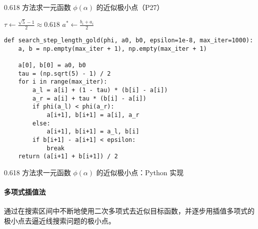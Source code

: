 \documentclass[cn]{elegantbook}
\begin{document}
\begin{algorithm}
    \caption{0.618 方法求一元函数 $\phi\left(\alpha\right)$ 的近似极小点（P27）}
    $\tau\leftarrow \frac{\sqrt{5}-1}{2}\approx 0.618$\;
    $a^{*}\leftarrow\frac{b_{i}+a_{i}}{2}$\;
\end{algorithm}

\begin{listing}
    \begin{verbatim}
def search_step_length_gold(phi, a0, b0, epsilon=1e-8, max_iter=1000):
    a, b = np.empty(max_iter + 1), np.empty(max_iter + 1)

    a[0], b[0] = a0, b0
    tau = (np.sqrt(5) - 1) / 2
    for i in range(max_iter):
        a_l = a[i] + (1 - tau) * (b[i] - a[i])
        a_r = a[i] + tau * (b[i] - a[i])
        if phi(a_l) < phi(a_r):
            a[i+1], b[i+1] = a[i], a_r
        else:
            a[i+1], b[i+1] = a_l, b[i]
        if b[i+1] - a[i+1] < epsilon:
            break
    return (a[i+1] + b[i+1]) / 2
    \end{verbatim}
    \caption{0.618 方法求一元函数 $\phi\left(\alpha\right)$ 的近似极小点：Python 实现}
\end{listing}

\paragraph{多项式插值法}

通过在搜索区间中不断地使用二次多项式去近似目标函数，并逐步用插值多项式的极小点去逼近线搜索问题的极小点。
\end{document}
